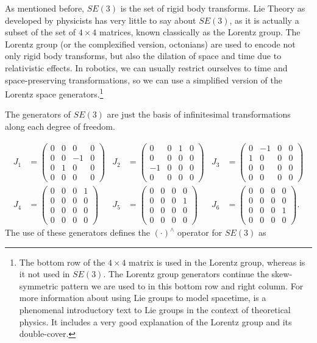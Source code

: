 As mentioned before, $SE(3)$ is the set of rigid body
transforms. Lie Theory as developed by physicists has very little
to say about $SE(3)$, as it is actually a subset of the
set of $4\times4$ matrices, known classically as the Lorentz group.
The Lorentz group (or the complexified version, octonians) are used
to encode not only rigid body transforms, but also the dilation of
space and time due to relativistic effects. In robotics, we can usually
restrict ourselves to time and space-preserving transformations, so
we can use a simplified version of the Lorentz space generators.\footnote{The bottom row of the $4\times4$ matrix is used in the Lorentz group,
whereas is it not used in $SE(3).$ The Lorentz group
generators continue the skew-symmetric pattern we are used to in this
bottom row and right column. For more information about using Lie
groups to model spacetime, \cite{schwichtenberg_2015} is a phenomenal
introductory text to Lie groups in the context of theoretical physics.
It includes a very good explanation of the Lorentz group and its double-cover.} 

The generators of $SE(3)$ are just the basis of infinitesimal
transformations along each degree of freedom.

\begin{align*}
J_{1} & =\begin{pmatrix}0 & 0 & 0 & 0\\
0 & 0 & -1 & 0\\
0 & 1 & 0 & 0\\
0 & 0 & 0 & 0
\end{pmatrix} & J_{2} & =\begin{pmatrix}0 & 0 & 1 & 0\\
0 & 0 & 0 & 0\\
-1 & 0 & 0 & 0\\
0 & 0 & 0 & 0
\end{pmatrix} & J_{3} & =\begin{pmatrix}0 & -1 & 0 & 0\\
1 & 0 & 0 & 0\\
0 & 0 & 0 & 0\\
0 & 0 & 0 & 0
\end{pmatrix}\\
J_{4} & =\begin{pmatrix}0 & 0 & 0 & 1\\
0 & 0 & 0 & 0\\
0 & 0 & 0 & 0\\
0 & 0 & 0 & 0
\end{pmatrix} & J_{5} & =\begin{pmatrix}0 & 0 & 0 & 0\\
0 & 0 & 0 & 1\\
0 & 0 & 0 & 0\\
0 & 0 & 0 & 0
\end{pmatrix} & J_{6} & =\begin{pmatrix}0 & 0 & 0 & 0\\
0 & 0 & 0 & 0\\
0 & 0 & 0 & 1\\
0 & 0 & 0 & 0
\end{pmatrix}.
\end{align*}
The use of these generators defines the $\left(\cdot\right)^{\wedge}$
operator for $SE(3)$ as


